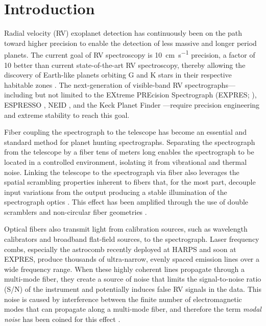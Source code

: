 \section{Introduction}
\label{modal-noise:intro}

Radial velocity (RV) exoplanet detection has continuously been on the path toward higher precision to enable the detection of less massive and longer period planets. The current goal of RV spectroscopy is \SI{10}{\centi\meter\per\second} precision, a factor of 10 better than current state-of-the-art RV spectroscopy, thereby allowing the discovery of Earth-like planets orbiting G and K stars in their respective habitable zones \citep{fischer_state_2016}. The next-generation of visible-band RV spectrographs---including but not limited to the EXtreme PREcision Spectrograph (EXPRES; \citet{jurgenson_expres_2016}), ESPRESSO \citep{megevand_espresso_2012}, NEID \citep{schwab_design_2016}, and the Keck Planet Finder \citep{gibson_kpf_2016}---require precision engineering and extreme stability to reach this goal.

Fiber coupling the spectrograph to the telescope has become an essential and standard method for planet hunting spectrographs. Separating the spectrograph from the telescope by a fiber tens of meters long enables the spectrograph to be located in a controlled environment, isolating it from vibrational and thermal noise. Linking the telescope to the spectrograph via fiber also leverages the spatial scrambling properties inherent to fibers that, for the most part, decouple input variations from the output producing a stable illumination of the spectrograph optics \citep{hunter_scrambling_1992}. This effect has been amplified through the use of double scramblers \citep{halverson_efficient_2015, spronck_fiber_2015} and non-circular fiber geometries \citep{chazelas_new_2010, spronck_use_2012, plavchan_precision_2013}.

Optical fibers also transmit light from calibration sources, such as wavelength calibrators and broadband flat-field sources, to the spectrograph. Laser frequency combs, especially the  astrocomb \citep{probst_laser_2014} recently deployed at HARPS and soon at EXPRES, produce thousands of ultra-narrow, evenly spaced emission lines over a wide frequency range. When these highly coherent lines propagate through a multi-mode fiber, they create a source of noise that limits the signal-to-noise ratio (S/N) of the instrument and potentially induces false RV signals in the data. This noise is caused by interference between the finite number of electromagnetic modes that can propagate along a multi-mode fiber, and therefore the term \textit{modal noise} has been coined for this effect \citep{epworth_phenomenon_1978}.

